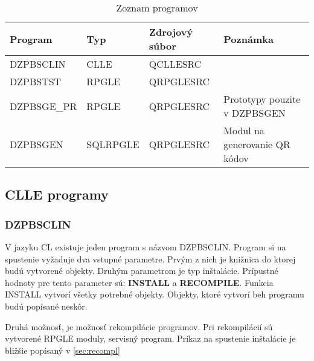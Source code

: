 \begin{table}[ht!]
\caption{Zoznam programov}
\label{tab:zoznam_programov}
\begin{tabular}{|l|l|l|l|}
\hline
\textbf{Program} & \textbf{Typ} & \textbf{Zdrojový súbor} & \textbf{Poznámka}             \\ \hline
DZPBSCLIN        & CLLE         & QCLLESRC                &                               \\ \hline
DZPBSTST         & RPGLE        & QRPGLESRC               &                               \\ \hline
DZPBSGE\_PR      & RPGLE        & QRPGLESRC               & Prototypy pouzite v DZPBSGEN  \\ \hline
DZPBSGEN         & SQLRPGLE     & QRPGLESRC               & Modul na generovanie QR kódov \\ \hline
\end{tabular}
\end{table}


\subsection{\acs{CLLE} programy}
\subsubsection{DZPBSCLIN}
V jazyku CL existuje jeden program s názvom DZPBSCLIN. Program si na spustenie vyžaduje dva vstupné parametre. Prvým z nich je knižnica do ktorej budú vytvorené objekty. Druhým parametrom je typ inštalácie. Prípustné hodnoty pre tento parameter sú: \textbf{INSTALL} a \textbf{RECOMPILE}. Funkcia INSTALL vytvorí všetky potrebné objekty. Objekty, ktoré vytvorí beh programu budú popísané neskôr.

Druhá možnosť, je možnosť rekompilácie programov. Pri rekompilácií sú vytvorené RPGLE moduly, servisný program. Príkaz na spustenie inštalácie je bližšie popísaný v \ref{sec:recompl}

